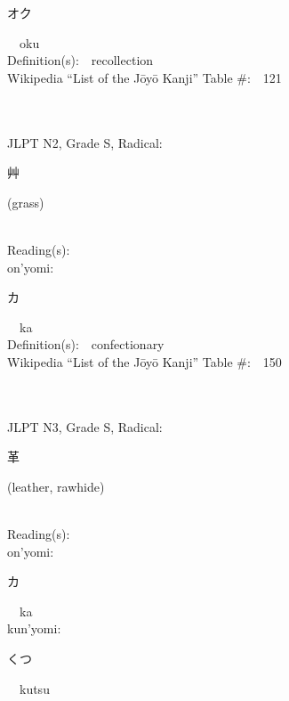 \begin{multicols}{2}
{\hspace*{2em}}{\begin{CJK}{UTF8}{min} オク \end{CJK}}\ \ oku\ \ \\
Definition(s):\ \ recollection \\
Wikipedia ``List of the J\=oy\=o Kanji'' Table \#:\ \ 121 \\
\ \ \\
{\fontsize{34pt}{40pt}  }\ \ \\  %
{JLPT N2, Grade S, Radical:\ \ {\begin{CJK}{UTF8}{min} 艸 \end{CJK}} (grass) } \\
Reading(s):\ \ \\
{\hspace*{1em}}on'yomi:\ \ \\
{\hspace*{2em}}{\begin{CJK}{UTF8}{min} カ \end{CJK}}\ \ ka\ \ \\
Definition(s):\ \ confectionary \\
Wikipedia ``List of the J\=oy\=o Kanji'' Table \#:\ \ 150 \\
\ \ \\
{\fontsize{34pt}{40pt}  }\ \ \\  %
{JLPT N3, Grade S, Radical:\ \ {\begin{CJK}{UTF8}{min} 革 \end{CJK}} (leather, rawhide) } \\
Reading(s):\ \ \\
{\hspace*{1em}}on'yomi:\ \ \\
{\hspace*{2em}}{\begin{CJK}{UTF8}{min} カ \end{CJK}}\ \ ka\ \ \\
{\hspace*{1em}}kun'yomi:\ \ \\
{\hspace*{2em}}{\begin{CJK}{UTF8}{min} くつ \end{CJK}}\ \ kutsu\ \ \\

\end{multicols}
